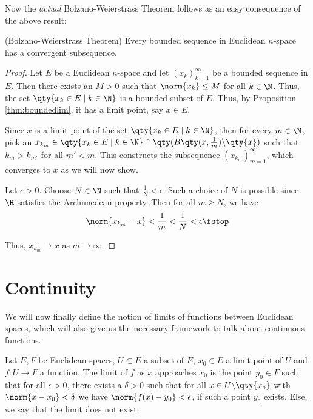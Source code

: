 Now the \emph{actual} Bolzano-Weierstrass Theorem follows as an easy consequence of the above result:

\begin{theorem}
  (Bolzano-Weierstrass Theorem) Every bounded sequence in Euclidean \( n \)-space has a convergent subsequence.
\end{theorem}
\begin{proof}
  Let \( E \) be a Euclidean \( n \)-space and let \( (x_k)_{k=1}^\infty \) be a bounded sequence in \( E \). Then there exists an \( M>0 \) such that \( \norm{x_k}\leq M \) for all \( k\in\N \). Thus, the set \( \qty{x_k\in E\mid k\in\N} \) is a bounded subset of \( E \). Thus, by Proposition \ref{thm:boundedlim}, it has a limit point, say \( x\in E \).

  \vspace{3mm}

  Since \( x \) is a limit point of the set \( \qty{x_k\in E\mid k\in\N} \), then for every \( m\in\N \), pick an \( x_{k_m}\in \qty{x_k\in E\mid k\in\N}\cap\qty(B\qty(x,\frac{1}{m})\backslash\qty{x}) \) such that \( k_m>k_{m'} \) for all \( m'<m \). This constructs the subsequence \( (x_{k_m})_{m=1}^\infty \), which converges to \( x \) as we will now show.

  \vspace{3mm}

  Let \( \epsilon>0 \). Choose \( N\in\N \) such that \( \frac{1}{N}<\epsilon \). Such a choice of \( N \) is possible since \( \R \) satisfies the Archimedean property. Then for all \( m\geq N \), we have
  \[ \norm{x_{k_m}-x}<\frac{1}{m}<\frac{1}{N}<\epsilon\fstop \]
  
  Thus, \( x_{k_m}\to x \) as \( m\to\infty \).
\end{proof}

\section{Continuity}
We will now finally define the notion of limits of functions between Euclidean spaces, which will also give us the necessary framework to talk about continuous functions.
\begin{definition}
  Let \( E, F \) be Euclidean spaces, \( U\subset E \) a subset of \( E \), \( x_0\in E \) a limit point of \( U \) and \( f:U\to F \) a function. The limit of \( f \) as \( x \) approaches \( x_0 \) is the point \( y_0\in F \) such that for all \( \epsilon>0 \), there exists a \( \delta>0 \) such that for all \( x\in U\backslash\qty{x_o} \) with \( \norm{x-x_0}<\delta \) we have \( \norm{f(x)-y_0}<\epsilon \), if such a point \( y_0 \) exists. Else, we say that the limit does not exist.
\end{definition}

